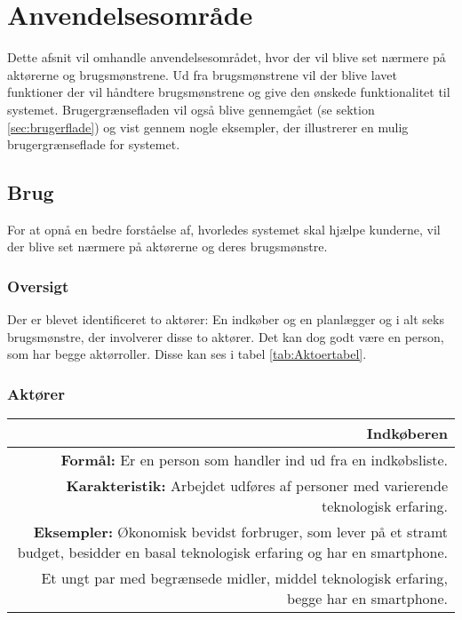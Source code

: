 \section{Anvendelsesområde}
Dette afsnit vil omhandle anvendelsesområdet, hvor der vil blive set nærmere på aktørerne og brugsmønstrene. Ud fra brugsmønstrene vil der blive lavet funktioner der vil håndtere brugsmønstrene og give den ønskede funktionalitet til systemet.
Brugergrænsefladen vil også blive gennemgået (se sektion \ref{sec:brugerflade}) og vist gennem nogle eksempler, der illustrerer en mulig brugergrænseflade for systemet.

\subsection{Brug}
For at opnå en bedre forståelse af, hvorledes systemet skal hjælpe kunderne, vil der blive set nærmere på aktørerne og deres brugsmønstre.

\subsubsection{Oversigt}
Der er blevet identificeret to aktører: En indkøber og en planlægger og i alt seks brugsmønstre, der involverer disse to aktører. Det kan dog godt være en person, som har begge aktørroller. Disse kan ses i tabel \ref{tab:Aktoertabel}.



\subsubsection{Aktører}
\begin{table}[H]
    \begin{tabularx}{\textwidth}{R}
    	\hline
        \textbf{Indkøberen} \\ \hline
        \textbf{Formål:} Er en person som handler ind ud fra en indkøbsliste. \\
        \textbf{Karakteristik:} Arbejdet udføres af personer med varierende teknologisk erfaring.   \\
        \textbf{Eksempler:} Økonomisk bevidst forbruger, som lever på et stramt budget, besidder en 
        basal teknologisk erfaring og har en smartphone.\\
        Et ungt par med begrænsede midler, middel teknologisk erfaring, begge har en smartphone.
    \end{tabularx}
\end{table}

